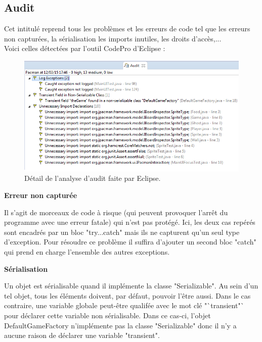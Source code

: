 \documentclass[12pt,a4paper,final]{article}
\newcommand{\smalltitle}[1]{\bigskip\large\textbf{#1}\par\normalsize\medskip}
\begin{document}
\subsection{Audit}
Cet intitulé reprend tous les problèmes et les erreurs de code tel que les erreurs non capturées, la sérialisation les imports inutiles, les droits d'accès,...\\
Voici celles détectées par l'outil CodePro d'Eclipse : 
\begin{figure}[!h]
	\centering
	\includegraphics[width=\textwidth]{Audit.png}
	\caption{\label{Audit}Détail de l'analyse d'audit faite par Eclipse.}
\end{figure}

\smalltitle{Erreur non capturée}
Il s'agit de morceaux de code à risque (qui peuvent provoquer l'arrêt du programme avec une erreur fatale) qui n'est pas protégé.
Ici, les deux cas repérés sont encadrés par un bloc "try...catch" mais ils ne capturent qu'un seul type d'exception. Pour résoudre ce problème il suffira d'ajouter un second bloc "catch" qui prend en charge l'ensemble des autres exceptions.

\smalltitle{Sérialisation}
Un objet est sérialisable quand il implémente la classe "Serializable". Au sein d'un tel objet, tous les éléments doivent, par défaut, pouvoir l'être aussi. Dans le cas contraire, une variable globale peut-être qualifée avec le mot clé "`transient"` pour déclarer cette variable non sérialisable.
Dans ce cas-ci, l'objet DefaultGameFactory n'implémente pas la classe "Serializable" donc il n'y a aucune raison de déclarer une variable "transient".
\end{document}
